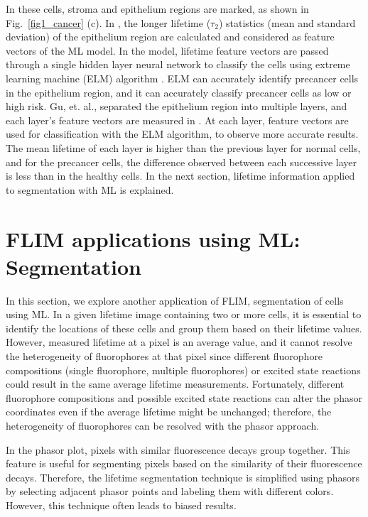 \documentclass[12pt]{iopart}
\begin{document}
In these cells, stroma and epithelium regions are marked, as shown in Fig.~\ref{fig1_cancer} (c). In \cite{cancer1}, the longer lifetime ($\tau_2$) statistics (mean and standard deviation) of the epithelium region are calculated and considered as feature vectors of the ML model. In the model, lifetime feature vectors are passed through a single hidden layer neural network to classify the cells using extreme learning machine (ELM) algorithm \cite{elm}. ELM can accurately identify precancer cells in the epithelium region, and it can accurately classify precancer cells as low or high risk. Gu, et. al., separated the epithelium region into multiple layers, and each layer's feature vectors are measured in \cite{cancer2}. At each layer, feature vectors are used for classification with the ELM algorithm, to observe more accurate results. The mean lifetime of each layer is higher than the previous layer for normal cells, and for the precancer cells, the difference observed between each successive layer is less than in the healthy cells. In the next section, lifetime information applied to segmentation with ML is explained.

\section{FLIM applications using ML: Segmentation} \label{sec3}
In this section, we explore another application of FLIM, segmentation of cells using ML. In a given lifetime image containing two or more cells, it is essential to identify the locations of these cells and group them based on their lifetime values. However, measured lifetime at a pixel is an average value, and it cannot resolve the heterogeneity of fluorophores at that pixel since different fluorophore compositions (single fluorophore, multiple fluorophores) or excited state reactions could result in the same average lifetime measurements. Fortunately, different fluorophore compositions and possible excited state reactions can alter the phasor coordinates even if the average lifetime might be unchanged; therefore, the heterogeneity of fluorophores can be resolved with the phasor approach. 

In the phasor plot, pixels with similar fluorescence decays group together. This feature is useful for segmenting pixels based on the similarity of their fluorescence decays. Therefore, the lifetime segmentation technique is simplified using phasors by selecting adjacent phasor points and labeling them with different colors. However, this technique often leads to biased results.  
\end{document}
